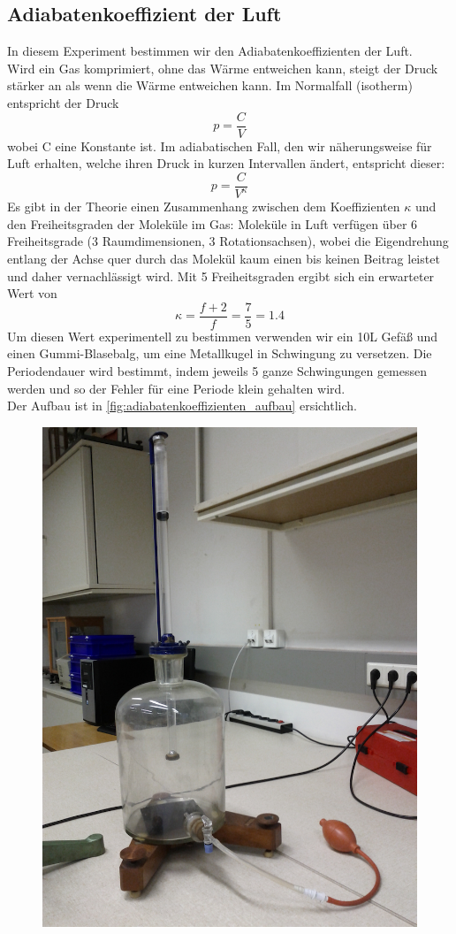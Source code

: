 \documentclass[12pt,a4paper]{article}
\begin{document}
\begin{multicols}{2}
\section{Adiabatenkoeffizient der Luft}
In diesem Experiment bestimmen wir den Adiabatenkoeffizienten der Luft. \\
Wird ein Gas komprimiert, ohne das Wärme entweichen kann, steigt der Druck stärker an als wenn die Wärme entweichen kann. Im Normalfall (isotherm) entspricht der Druck
$$p = \frac{C}{V}$$
wobei C eine Konstante ist.
Im adiabatischen Fall, den wir näherungsweise für Luft erhalten, welche ihren Druck in kurzen Intervallen ändert, entspricht dieser:
$$p = \frac{C}{V^\kappa}$$
Es gibt in der Theorie einen Zusammenhang zwischen dem Koeffizienten $\kappa$ und den Freiheitsgraden der Moleküle im Gas: Moleküle in Luft verfügen über 6 Freiheitsgrade (3 Raumdimensionen, 3 Rotationsachsen), wobei die Eigendrehung entlang der Achse quer durch das Molekül kaum einen bis keinen Beitrag leistet und daher vernachlässigt wird. Mit 5 Freiheitsgraden ergibt sich ein erwarteter Wert von
$$\kappa = \frac{f+2}{f} = \frac{7}{5} = 1.4$$
Um diesen Wert experimentell zu bestimmen verwenden wir ein 10L Gefäß und einen Gummi-Blasebalg, um eine Metallkugel in Schwingung zu versetzen. Die Periodendauer wird bestimmt, indem jeweils 5 ganze Schwingungen gemessen werden und so der Fehler für eine Periode klein gehalten wird.\\
Der Aufbau ist in \ref{fig:adiabatenkoeffizienten_aufbau} ersichtlich.
\begin{figure}[H]
	\centering
	\includegraphics[scale=0.25]{./figure/koeffizient.png}

\end{figure}
\end{multicols}
\end{document}
